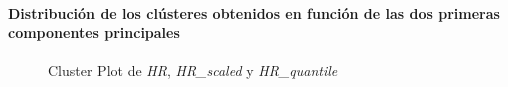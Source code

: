 \paragraph{Distribución de los clústeres obtenidos en función de las dos primeras componentes principales}

\begin{figure}[H]
    \centering
    \caption{Cluster Plot de \textit{HR}, \textit{HR\_scaled} y \textit{HR\_quantile}}
    \label{fig:raw_data_pc_fc}
\end{figure}

